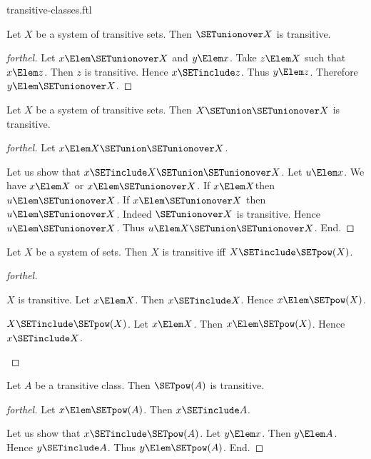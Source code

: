 \documentclass{stex}
\begin{document}
\begin{smodule}{transitive-classes.ftl}
\begin{proposition}[forthel]
  Let $X$ be a system of transitive sets.
  Then $\SETunionover X$ is transitive.
\end{proposition}
\begin{proof}[forthel]
  Let $x \Elem \SETunionover X$ and $y \Elem x$.
  Take $z \Elem X$ such that $x \Elem z$.
  Then $z$ is transitive.
  Hence $x \SETinclude z$.
  Thus $y \Elem z$.
  Therefore $y \Elem \SETunionover X$.
\end{proof}

\begin{proposition}[forthel]
  Let $X$ be a system of transitive sets.
  Then $X \SETunion \SETunionover X$ is transitive.
\end{proposition}
\begin{proof}[forthel]
  Let $x \Elem X \SETunion \SETunionover X$.

  Let us show that $x \SETinclude X \SETunion \SETunionover X$.
    Let $u \Elem x$.
    We have $x \Elem X$ or $x \Elem \SETunionover X$.
    If $x \Elem X$then $u \Elem \SETunionover X$.
    If $x \Elem \SETunionover X$ then $u \Elem \SETunionover X$.
    Indeed $\SETunionover X$ is transitive.
    Hence $u \Elem \SETunionover X$.
    Thus $u \Elem X \SETunion \SETunionover X$.
  End.
\end{proof}

\begin{proposition}[forthel]
  Let $X$ be a system of sets.
  Then $X$ is transitive iff $X \SETinclude \SETpow(X)$.
\end{proposition}
\begin{proof}[forthel]
  \begin{case}{$X$ is transitive.}
    Let $x \Elem X$.
    Then $x \SETinclude X$.
    Hence $x \Elem \SETpow(X)$.
  \end{case}

  \begin{case}{$X \SETinclude \SETpow(X)$.}
    Let $x \Elem X$.
    Then $x \Elem \SETpow(X)$.
    Hence $x \SETinclude X$.
  \end{case}
\end{proof}

\begin{proposition}[forthel]
  Let $A$ be a transitive class.
  Then $\SETpow(A)$ is transitive.
\end{proposition}
\begin{proof}[forthel]
  Let $x \Elem \SETpow(A)$.
  Then $x \SETinclude A$.

  Let us show that $x \SETinclude \SETpow(A)$.
    Let $y \Elem x$.
    Then $y \Elem A$.
    Hence $y \SETinclude A$.
    Thus $y \Elem \SETpow(A)$.
  End.
\end{proof}
\end{smodule}
\end{document}
